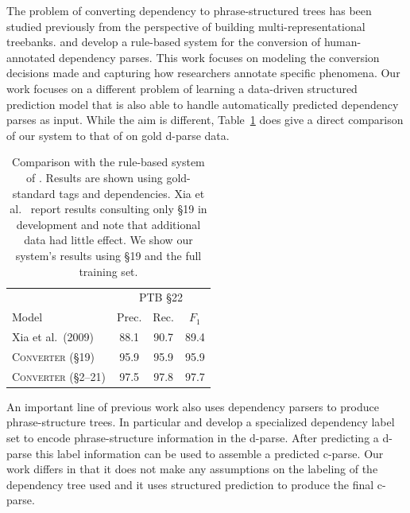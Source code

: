 \documentclass[11pt,letterpaper]{article}
\newcommand{\ParseName}{\textsc{Converter}\xspace}
\newcommand{\nascomment}[1]{\textcolor{blue}{\bf \small [#1 --nas]}}
\begin{document}
The problem of converting dependency to phrase-structured trees has
been studied previously from the perspective of building
multi-representational treebanks.   and
 develop a rule-based system for the
conversion of human-annotated dependency parses. This work focuses on
modeling the conversion decisions made and capturing how researchers
annotate specific phenomena. Our work focuses on a different problem
of learning a data-driven structured prediction model that is also
able to handle automatically predicted dependency parses as
input. While the aim is different, Table~\ref{tab:convert} does give a
direct comparison of our system to that of  on 
gold d-parse data.


\begin{table}
  \centering
  \small
  \begin{tabular}{lccc}

    \toprule
    & \multicolumn{3}{c}{PTB \S 22} \\
    Model & Prec. & Rec. & $F_1$  \\
    \midrule

   
    Xia et al.~(2009)    & 88.1 & 90.7 & 89.4 \\
    \ParseName{} (\S 19)  & 95.9 & 95.9 & 95.9    \\
    \ParseName{}  (\S 2--21) & 97.5 & 97.8 & 97.7    \\
    \bottomrule

  \end{tabular}
  \caption{Comparison with the rule-based system of .
    Results are shown using gold-standard tags and
    dependencies.  Xia et al.~
 report results consulting only \S 19 in development and
note that additional data had little effect.  We show our system's
results using \S 19 and the full training set. 
  \label{tab:convert}}
\end{table}


An important line of previous work also uses dependency parsers to
produce phrase-structure trees. In particular 
and  develop a specialized dependency label
set to encode phrase-structure information in the d-parse. After
predicting a d-parse this label information can be used to assemble
a predicted c-parse. Our work differs in that it does not make any
assumptions on the labeling of the dependency tree used and it uses  
 structured prediction to produce the final c-parse.
\end{document}
